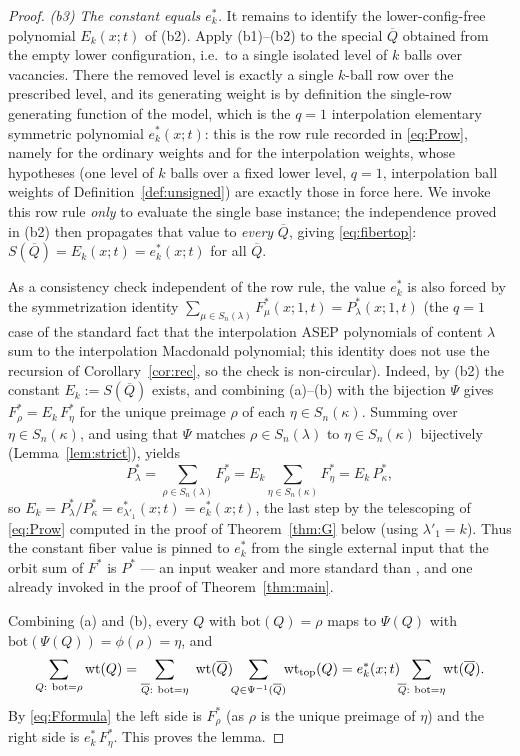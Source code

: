\begin{proof}
\emph{(b3) The constant equals $e^*_k$.} It remains to identify the lower-config-free
polynomial $E_k(x;t)$ of (b2). Apply (b1)--(b2) to the special $\overline Q$ obtained
from the empty lower configuration, i.e.\ to a single isolated level of $k$ balls over
vacancies. There the removed level is exactly a single $k$-ball row over the
prescribed level, and its generating weight is by definition the single-row
generating function of the model, which is the $q=1$ interpolation elementary
symmetric polynomial $e^*_k(x;t)$: this is the row rule recorded in \eqref{eq:Prow},
namely \cite[Lem.~5.4]{AMW25} for the ordinary weights and \cite[Lem.~5.6]{BDW25a}
for the interpolation weights, whose hypotheses (one level of $k$ balls over a fixed
lower level, $q=1$, interpolation ball weights of Definition~\ref{def:unsigned}) are
exactly those in force here. We invoke this row rule \emph{only} to evaluate the
single base instance; the independence proved in (b2) then propagates that value to
\emph{every} $\overline Q$, giving \eqref{eq:fibertop}:
$S(\overline Q)=E_k(x;t)=e^*_k(x;t)$ for all $\overline Q$.

As a consistency check independent of the row rule, the value $e^*_k$ is also forced
by the symmetrization identity
$\sum_{\mu\in S_n(\lambda)}F^*_\mu(x;1,t)=P^*_\lambda(x;1,t)$ (the $q=1$ case of the
standard fact that the interpolation ASEP polynomials of content $\lambda$ sum to the
interpolation Macdonald polynomial; this identity does not use the recursion of
Corollary~\ref{cor:rec}, so the check is non-circular). Indeed, by (b2) the constant
$E_k:=S(\overline Q)$ exists, and combining (a)--(b) with the bijection $\Psi$ gives
$F^*_\rho=E_k\,F^*_\eta$ for the unique preimage $\rho$ of each $\eta\in S_n(\kappa)$.
Summing over $\eta\in S_n(\kappa)$, and using that $\Psi$ matches $\rho\in S_n(\lambda)$
to $\eta\in S_n(\kappa)$ bijectively (Lemma~\ref{lem:strict}), yields
\[
P^*_\lambda=\sum_{\rho\in S_n(\lambda)}F^*_\rho
=E_k\sum_{\eta\in S_n(\kappa)}F^*_\eta=E_k\,P^*_\kappa,
\]
so $E_k=P^*_\lambda/P^*_\kappa=e^*_{\lambda'_1}(x;t)=e^*_k(x;t)$, the last step by the
telescoping of \eqref{eq:Prow} computed in the proof of Theorem~\ref{thm:G} below
(using $\lambda'_1=k$). Thus the constant fiber value is pinned to $e^*_k$ from the
single external input that the orbit sum of $F^*$ is $P^*$ --- an input weaker and
more standard than \cite[Lem.~5.6]{BDW25a}, and one already invoked in the proof of
Theorem~\ref{thm:main}.

Combining (a) and (b), every $Q$ with $\mathrm{bot}(Q)=\rho$ maps to $\Psi(Q)$ with
$\mathrm{bot}(\Psi(Q))=\phi(\rho)=\eta$, and
\[
\sum_{Q:\ \mathrm{bot}=\rho}\qthreewt(Q)
=\sum_{\overline Q:\ \mathrm{bot}=\eta}\ \qthreewt(\overline Q)\!\!\sum_{Q\in\Psi^{-1}(\overline Q)}\!\!\qthreewt_{\mathrm{top}}(Q)
=e^*_k(x;t)\!\!\sum_{\overline Q:\ \mathrm{bot}=\eta}\!\!\qthreewt(\overline Q).
\]
By \eqref{eq:Fformula} the left side is $F^*_\rho$ (as $\rho$ is the unique preimage
of $\eta$) and the right side is $e^*_k\,F^*_\eta$. This proves the lemma.
\end{proof}


